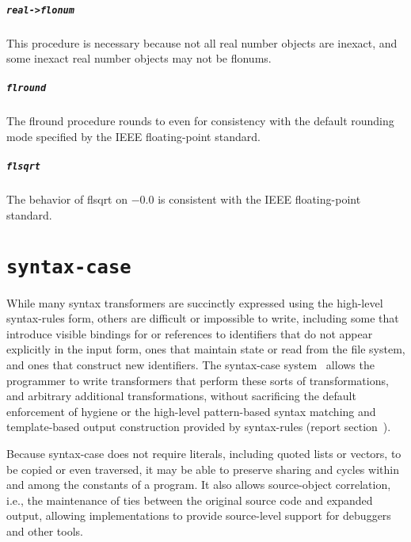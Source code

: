 \documentclass[twoside,twocolumn]{algol60}
\begin{document}
\paragraph{{\tt real->flonum}}

This procedure is necessary because not all real number objects are inexact, and
some inexact real number objects may not be flonums.

\paragraph{{\tt flround}}

The {\cf flround} procedure rounds to even for consistency with the default rounding
mode specified by the IEEE floating-point standard.

\paragraph{{\tt flsqrt}}

The behavior of {\cf flsqrt} on $-0.0$ is consistent with the IEEE
floating-point standard.


\chapter{{\tt syntax-case}}

While many syntax transformers are succinctly expressed using the
high-level {\cf syntax-rules} form, others are difficult or impossible
to write, including some that introduce visible bindings for or references
to identifiers that do not appear explicitly in the input form, ones that
maintain state or read from the file system, and ones that construct new
identifiers.
The {\cf syntax-case} system~\cite{syntacticabstraction} 
allows the programmer to write transformers that perform these sorts of
transformations, and arbitrary additional transformations, without
sacrificing the default enforcement of hygiene or the high-level
pattern-based syntax matching and template-based output construction
provided by {\cf syntax-rules} (report
section~).

Because {\cf syntax-case} does not require literals, including quoted
lists or vectors, to be copied or even traversed, it may be able to preserve sharing
and cycles within and among the constants of a program.  It also
allows source-object correlation, i.e., the maintenance of ties
between the original source code and expanded output, allowing
implementations to provide source-level support for debuggers and
other tools.
\end{document}
